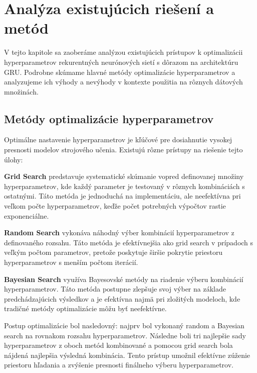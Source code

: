 
\section{Analýza existujúcich riešení a metód}

V tejto kapitole sa zaoberáme analýzou existujúcich prístupov k optimalizácii hyperparametrov rekurentných neurónových sietí s dôrazom na architektúru GRU. Podrobne skúmame hlavné metódy optimalizácie hyperparametrov a analyzujeme ich výhody a nevýhody v kontexte použitia na rôznych dátových množinách.

\subsection{Metódy optimalizácie hyperparametrov}

Optimálne nastavenie hyperparametrov je kľúčové pre dosiahnutie vysokej presnosti modelov strojového učenia. Existujú rôzne prístupy na riešenie tejto úlohy:

\textbf{Grid Search} predstavuje systematické skúmanie vopred definovanej množiny hyperparametrov, kde každý parameter je testovaný v rôznych kombináciách s ostatnými. Táto metóda je jednoduchá na implementáciu, ale neefektívna pri veľkom počte hyperparametrov, keďže počet potrebných výpočtov rastie exponenciálne.

\textbf{Random Search} vykonáva náhodný výber kombinácií hyperparametrov z definovaného rozsahu. Táto metóda je efektívnejšia ako grid search v prípadoch s veľkým počtom parametrov, pretože poskytuje širšie pokrytie priestoru hyperparametrov s menším počtom iterácií.

\textbf{Bayesian Search} využíva Bayesovské metódy na riadenie výberu kombinácií hyperparametrov. Táto metóda postupne zlepšuje svoj výber na základe predchádzajúcich výsledkov a je efektívna najmä pri zložitých modeloch, kde tradičné metódy optimalizácie môžu byť neefektívne.

Postup optimalizácie bol nasledovný: najprv bol vykonaný random a Bayesian search na rovnakom rozsahu hyperparametrov. Následne boli tri najlepšie sady hyperparametrov z oboch metód kombinované a pomocou grid search bola nájdená najlepšia výsledná kombinácia. Tento prístup umožnil efektívne zúženie priestoru hľadania a zvýšenie presnosti finálneho výberu hyperparametrov.


